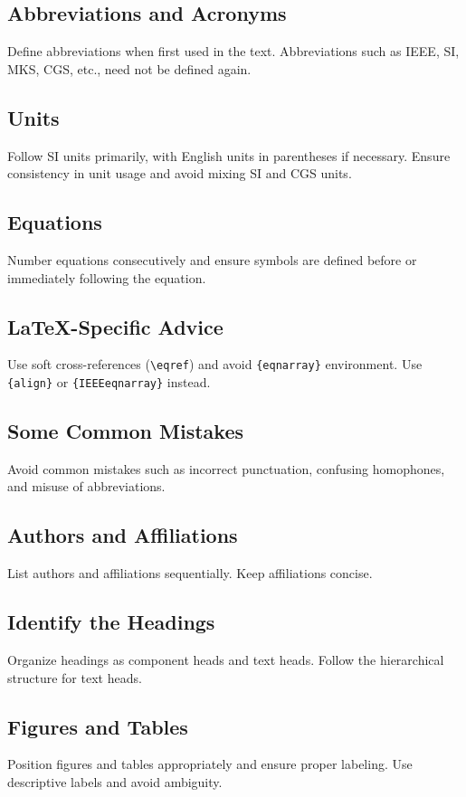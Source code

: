 \documentclass[conference]{IEEEtran}
\begin{document}
\subsection{Abbreviations and Acronyms}\label{AA}
Define abbreviations when first used in the text. Abbreviations such as IEEE, SI, MKS, CGS, etc., need not be defined again.

\subsection{Units}
Follow SI units primarily, with English units in parentheses if necessary. Ensure consistency in unit usage and avoid mixing SI and CGS units.

\subsection{Equations}
Number equations consecutively and ensure symbols are defined before or immediately following the equation.

\subsection{\LaTeX-Specific Advice}
Use soft cross-references (\verb|\eqref|) and avoid \verb|{eqnarray}| environment. Use \verb|{align}| or \verb|{IEEEeqnarray}| instead.

\subsection{Some Common Mistakes}\label{SCM}
Avoid common mistakes such as incorrect punctuation, confusing homophones, and misuse of abbreviations.

\subsection{Authors and Affiliations}
List authors and affiliations sequentially. Keep affiliations concise.

\subsection{Identify the Headings}
Organize headings as component heads and text heads. Follow the hierarchical structure for text heads.

\subsection{Figures and Tables}
Position figures and tables appropriately and ensure proper labeling. Use descriptive labels and avoid ambiguity.
\end{document}
